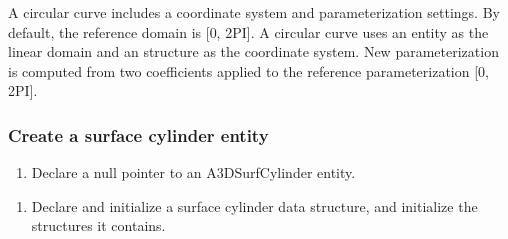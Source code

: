 \documentclass[letterpaper,12pt,english,openany,oneside]{sphinxmanual}
\begin{document}
A circular curve includes a coordinate system and parameterization settings. By default, the reference domain is {[}0, 2PI{]}. A circular curve uses an  entity as the linear domain and an  structure as the coordinate system. New parameterization is computed from two coefficients applied to the reference parameterization {[}0, 2PI{]}.


\subsubsection{Create a surface cylinder entity}
\label{\detokenize{Plugins_A3D_API:create-a-surface-cylinder-entity}}\begin{enumerate}
%
\item {} 
Declare a null pointer to an A3DSurfCylinder entity.

\end{enumerate}

\begin{sphinxVerbatim}[commandchars=\\\{\}]
   
\end{sphinxVerbatim}
\begin{enumerate}
%
\setcounter{enumi}{1}
\item {} 
Declare and initialize a surface cylinder data structure, and initialize the structures it contains.

\end{enumerate}
\end{document}
